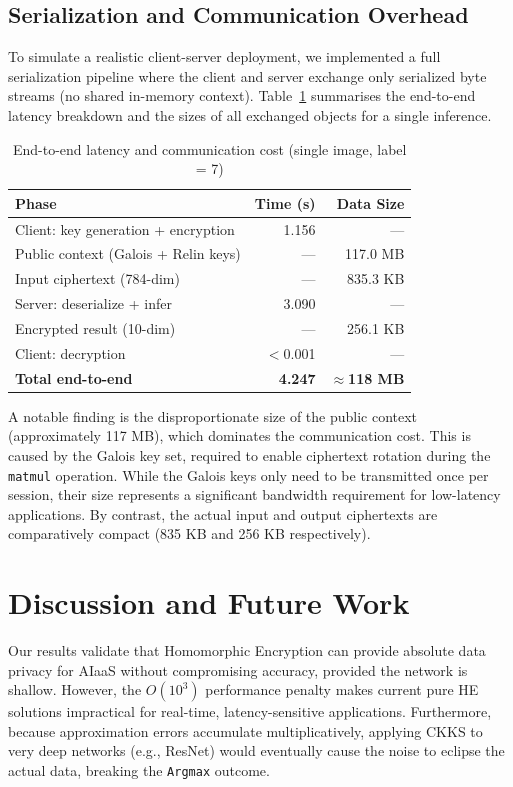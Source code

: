 \documentclass[runningheads]{llncs}
\begin{document}
\subsection{Serialization and Communication Overhead}
To simulate a realistic client-server deployment, we implemented a full serialization pipeline where the client and server exchange only serialized byte streams (no shared in-memory context). Table~\ref{tab:serial} summarises the end-to-end latency breakdown and the sizes of all exchanged objects for a single inference.

\begin{table}[ht]
\centering
\caption{End-to-end latency and communication cost (single image, label = 7)}
\label{tab:serial}
\begin{tabular}{@{}lrr@{}}
\toprule
\textbf{Phase} & \textbf{Time (s)} & \textbf{Data Size} \\ \midrule
Client: key generation + encryption & 1.156 & --- \\
\quad Public context (Galois + Relin keys) & --- & 117.0 MB \\
\quad Input ciphertext (784-dim) & --- & 835.3 KB \\
\midrule
Server: deserialize + infer & 3.090 & --- \\
\quad Encrypted result (10-dim) & --- & 256.1 KB \\
\midrule
Client: decryption & $<$0.001 & --- \\
\midrule
\textbf{Total end-to-end} & \textbf{4.247} & \textbf{$\approx$118 MB} \\ \bottomrule
\end{tabular}
\end{table}

A notable finding is the disproportionate size of the public context (approximately 117 MB), which dominates the communication cost. This is caused by the Galois key set, required to enable ciphertext rotation during the \texttt{matmul} operation. While the Galois keys only need to be transmitted once per session, their size represents a significant bandwidth requirement for low-latency applications. By contrast, the actual input and output ciphertexts are comparatively compact (835 KB and 256 KB respectively).

\section{Discussion and Future Work}
Our results validate that Homomorphic Encryption can provide absolute data privacy for AIaaS without compromising accuracy, provided the network is shallow. However, the $O(10^3)$ performance penalty makes current pure HE solutions impractical for real-time, latency-sensitive applications. Furthermore, because approximation errors accumulate multiplicatively, applying CKKS to very deep networks (e.g., ResNet) would eventually cause the noise to eclipse the actual data, breaking the \texttt{Argmax} outcome. 
\end{document}
